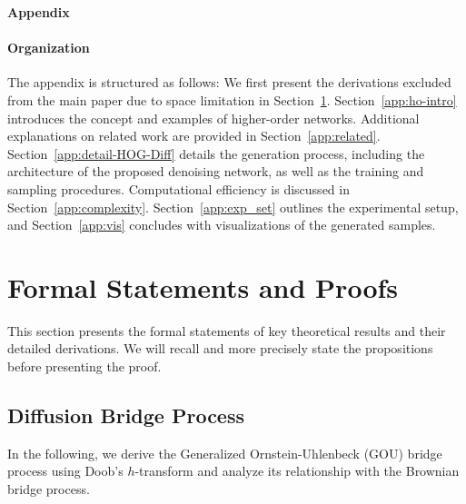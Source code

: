 \newpage
\appendix
\onecolumn
\begin{center}{\bf \Large Appendix}\end{center}
\vspace{0.15in}


\paragraph{Organization} 
The appendix is structured as follows: 
We first present the derivations excluded from the main paper due to space limitation in Section~\ref{app:proof}.
Section~\ref{app:ho-intro} introduces the concept and examples of higher-order networks.
Additional explanations on related work are provided in Section~\ref{app:related}. 
Section~\ref{app:detail-HOG-Diff} details the generation process, including the architecture of the proposed denoising network, as well as the training and sampling procedures.
Computational efficiency is discussed in Section~\ref{app:complexity}.
Section~\ref{app:exp_set} outlines the experimental setup, and Section~\ref{app:vis} concludes with visualizations of the generated samples.


\section{Formal Statements and Proofs}
\label{app:proof}
This section presents the formal statements of key theoretical results and their detailed derivations. 
We will recall and more precisely state the propositions before presenting the proof.

\subsection{Diffusion Bridge Process}

In the following, we derive the Generalized Ornstein-Uhlenbeck (GOU) bridge process using Doob's $h$-transform \cite{doob-h-transform1984} and analyze its relationship with the Brownian bridge process.

